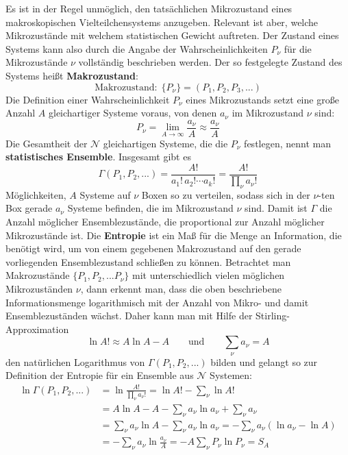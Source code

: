 \documentclass[9pt]{report}
\begin{document}
Es ist in der Regel unmöglich, den tatsächlichen Mikrozustand eines makroskopischen Vielteilchensystems anzugeben. Relevant ist aber, welche Mikrozustände mit welchem statistischen Gewicht auftreten. Der Zustand eines Systems kann also durch die Angabe der Wahrscheinlichkeiten $P_{\nu}$ für die Mikrozustände $\nu$ vollständig beschrieben werden. Der so festgelegte Zustand des Systems heißt \textbf{Makrozustand}:
\begin{equation}
\mathrm{Makrozustand}:\;\{P_{\nu}\}=(P_1,P_2,P_3,...)
\end{equation}
Die Definition einer Wahrscheinlichkeit $P_{\nu}$ eines Mikrozustands setzt eine große Anzahl $A$ gleichartiger Systeme voraus, von denen $a_{\nu}$ im Mikrozustand $\nu$ sind:
\begin{equation}
P_{\nu}=\lim_{A\to\infty}\frac{a_{\nu}}{A}\approx \frac{a_{\nu}}{A}
\end{equation}
Die Gesamtheit der $\mathcal{N}$ gleichartigen Systeme, die die $P_{\nu}$ festlegen, nennt man \textbf{statistisches Ensemble}. Insgesamt gibt es
\begin{equation}
\Gamma(P_1,P_2,...) = \frac{A!}{a_1!\,a_2!\cdots a_{k}!}=\frac{A!}{\displaystyle\prod_{\nu}a_{\nu}!}
\end{equation}
Möglichkeiten, $A$ Systeme auf $\nu$ Boxen so zu verteilen, sodass sich in der $\nu$-ten Box gerade $a_{\nu}$ Systeme befinden, die im Mikrozustand $\nu$ sind. Damit ist $\Gamma$ die Anzahl möglicher Ensemblezustände, die proportional zur Anzahl möglicher Mikrozustände ist. Die \textbf{Entropie} ist ein Maß für die Menge an Information, die benötigt wird, um von einem gegebenen Makrozustand auf den gerade vorliegenden Ensemblezustand schließen zu können. Betrachtet man Makrozustände $\{P_1,P_2,...P_{\nu}\}$ mit unterschiedlich vielen möglichen Mikrozuständen $\nu$, dann erkennt man, dass die oben beschriebene Informationsmenge logarithmisch mit der Anzahl von Mikro- und damit Ensemblezuständen wächst. Daher kann man mit Hilfe der Stirling-Approximation
\begin{equation}
\ln A! \approx A\ln A -A\qquad\mathrm{und} \qquad\sum_{\nu}a_{\nu} =A
\end{equation}
den natürlichen Logarithmus von $\Gamma(P_1,P_2,...)$ bilden und gelangt so zur Definition der Entropie für ein Ensemble aus $\mathcal{N}$ Systemen:
\begin{align}
\ln\Gamma(P_1,P_2,...) &= \ln\frac{A!}{\displaystyle\prod_{\nu}a_{\nu}!} =\ln A! -\sum_{\nu}\ln A!\\
&= A\ln A-A-\sum_{\nu}a_{\nu}\ln a_{\nu}+\sum_{\nu}a_{\nu}\\
&= \sum_{\nu}a_{\nu}\ln A - \sum_{\nu}a_{\nu}\ln a_{\nu} = -\sum_{\nu}a_{\nu}(\ln a_{\nu}-\ln A)\\
&= -\sum_{\nu}a_{\nu}\ln\frac{a_{\nu}}{A} = -A\sum_{\nu}P_{\nu}\ln P_{\nu} = S_{A}
\end{align}
\end{document}
